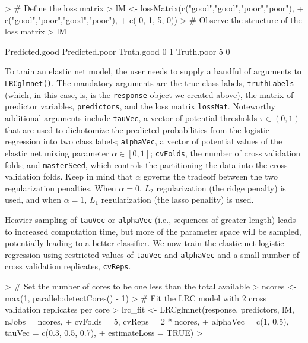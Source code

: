 \documentclass{article}
\begin{document}
\begin{Schunk}
\begin{Sinput}
> # Define the loss matrix
> lM <- lossMatrix(c("good","good","poor","poor"),
+                  c("good","poor","good","poor"),
+                  c(     0,     1,     5,     0))
> # Observe the structure of the loss matrix
> lM
\end{Sinput}
\begin{Soutput}
           Predicted.good Predicted.poor
Truth.good              0              1
Truth.poor              5              0
\end{Soutput}
\end{Schunk}

To train an elastic net model, the user needs to supply a handful of arguments to {\tt LRCglmnet()}. 
The mandatory arguments are the true class labels, {\tt truthLabels} (which, in this case, is, is the {\tt response} 
object we created above), the matrix of predictor variables, {\tt predictors}, 
and the loss matrix {\tt lossMat}. Noteworthy additional arguments include {\tt tauVec}, a vector of potential 
thresholds $\tau \in (0, 1)$ that are used to dichotomize the predicted probabilities from the logistic regression 
into two class labels; {\tt alphaVec}, a vector of potential values of the elastic net mixing parameter 
$\alpha \in [0, 1]$; {\tt cvFolds}, the number of cross validation folds; and {\tt masterSeed}, which controls 
the partitioning the data into the cross validation folds. Keep in mind that $\alpha$ governs the tradeoff between 
the two regularization penalties. When $\alpha = 0$, $L_2$ regularization (the ridge penalty) is used,
and when $\alpha = 1$, $L_1$ regularization (the lasso penality) is used.

Heavier sampling of {\tt tauVec} or {\tt alphaVec} (i.e., sequences of greater length) leads to 
increased computation time, but more of the parameter space will be sampled, potentially leading to a better 
classifier.  We now train the elastic net logistic regression using restricted values of {\tt tauVec} and 
{\tt alphaVec} and a small number of cross validation replicates, {\tt cvReps}.
\begin{Schunk}
\begin{Sinput}
> # Set the number of cores to be one less than the total available
> ncores <- max(1, parallel::detectCores() - 1)
> # Fit the LRC model with 2 cross validation replicates per core
> lrc_fit <- LRCglmnet(response, predictors, lM, nJobs = ncores,
+                      cvFolds = 5, cvReps = 2 * ncores,
+                      alphaVec = c(1, 0.5), tauVec = c(0.3, 0.5, 0.7),
+                      estimateLoss = TRUE)
> 
\end{Sinput}
\end{Schunk}
\end{document}
